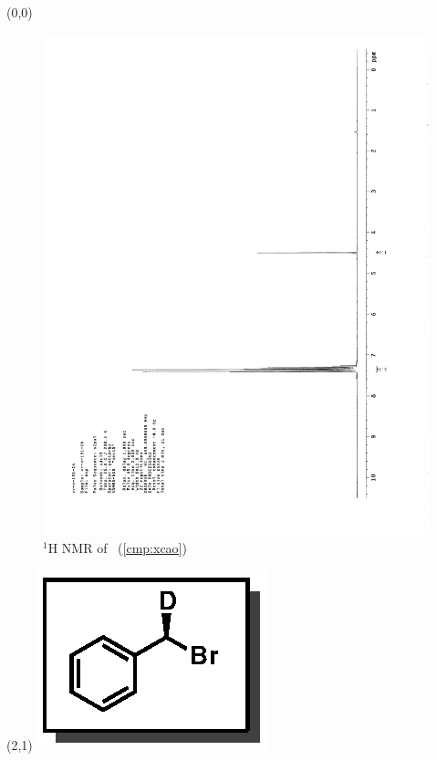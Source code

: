 \begin{textblock}{20}(0,0)
\begin{figure}[htb]
\caption{$^1$H NMR of \CMPxcao\ (\ref{cmp:xcao})}
\includegraphics[scale=0.75, trim = 0mm 0mm 0mm 5mm,
clip]{chp_alkylation/images/nmr/xcaoH}
\vspace{-100pt}
\end{figure}
\end{textblock}
\begin{textblock}{1}(2,1)
\includegraphics[scale=0.8, angle=90]{chp_alkylation/images/xcao}
\end{textblock}
